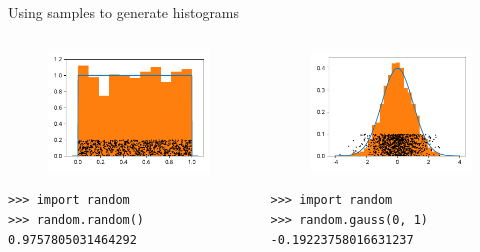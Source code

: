 \documentclass[12pt, aspectratio=149]{beamer}
\theoremstyle{plain}
\begin{document}
\begin{frame}[fragile]{Using samples to generate histograms}
\begin{columns}
\begin{column}{0.5\textwidth}
	\begin{center}
 \begin{figure}
	 \centering
	 \includegraphics[width=0.99\linewidth]{figures/uniform_samples_hist}
 \end{figure}
 \begin{verbatim}
>>> import random
>>> random.random()
0.9757805031464292
 \end{verbatim}
 \end{center}
\end{column}
\begin{column}{0.5\textwidth}  %
	\begin{center}
 \begin{figure}
	 \centering
	 \includegraphics[width=0.99\linewidth]{figures/normal_samples_hist}
 \end{figure}
 \begin{verbatim}
>>> import random
>>> random.gauss(0, 1)
-0.19223758016631237
 \end{verbatim}
 \end{center}
\end{column}
\end{columns}
\end{frame}
\end{document}
